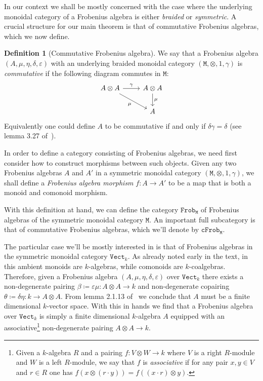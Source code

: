 \documentclass[11pt, reqno]{amsart}
\theoremstyle{definition}
\newtheorem{definition}[theorem]{Definition}
\newcommand{\cat}{\texttt}
\newcommand{\catfont}{\texttt}
\newcommand{\Vect}{{\catfont{Vect}}}        %
\newcommand{\Frob}{{\catfont{Frob}}} %
\newcommand{\cFrob}{{\catfont{cFrob}}} %
\begin{document}
In our context we shall be mostly concerned with the case where the underlying
monoidal category of a Frobenius algebra is either \emph{braided} or
\emph{symmetric}. A crucial structure for our main theorem is that of
commutative Frobenius algebras, which we now define.

\begin{definition}[Commutative Frobenius algebra]
\label{def:commutative-frobenius-algebra}
We say that a Frobenius algebra \((A, \mu, \eta, \delta, \varepsilon)\) with an
underlying braided monoidal category \((\cat M, \otimes, 1, \gamma)\) is
\emph{commutative} if the following diagram commutes in \(\cat M\):
\[
\begin{tikzcd}
A \otimes A \ar[r, "\gamma"] \ar[rd, "\mu"'] &A \otimes A \ar[d, "\mu"] \\
&A
\end{tikzcd}
\]
Equivalently one could define \(A\) to be commutative if and only if \(\delta
\gamma = \delta\) (see lemma 3.27 of~\cite{geiger}).
\end{definition}

In order to define a category consisting of Frobenius algebras, we need first
consider how to construct morphisms between such objects. Given any two
Frobenius algebras \(A\) and \(A'\) in a symmetric monoidal category
\((\cat M, \otimes, 1, \gamma)\), we shall define a \emph{Frobenius algebra
  morphism} \(f: A \to A'\) to be a map that is both a monoid and comonoid
morphism.

With this definition at hand, we can define the category \(\Frob_{\cat M}\) of
Frobenius algebras of the symmetric monoidal category \(\cat M\). An important
full subcategory is that of commutative Frobenius algebras, which we'll denote
by \(\cFrob_{\cat M}\).

The particular case we'll be mostly interested in is that of Frobenius algebras
in the symmetric monoidal category \(\Vect_k\). As already noted early in the
text, in this ambient monoids are \(k\)-algebras, while comonoids are
\(k\)-coalgebras. Therefore, given a Frobenius algebra
\((A, \mu, \eta, \delta, \varepsilon)\) over \(\Vect_k\) there exists a
non-degenerate pairing \(\beta \coloneq \varepsilon \mu: A \otimes A \to k\) and
non-degenerate copairing \(\theta \coloneq \delta \eta: k \to A \otimes
A\). From lemma 2.1.13 of~\cite{kock} we conclude that \(A\) must be a finite
dimensional \(k\)-vector space. With this in hands we find that a Frobenius
algebra over \(\Vect_k\) is simply a finite dimensional \(k\)-algebra \(A\)
equipped with an associative\footnote{Given a \(k\)-algebra \(R\) and a pairing
  \(f: V \otimes W \to k\) where \(V\) is a right \(R\)-module and \(W\) is a
  left \(R\)-module, we say that \(f\) is \emph{associative} if for any pair
  \(x, y \in V\) and \(r \in R\) one has
  \(f(x \otimes (r \cdot y)) = f((x \cdot r) \otimes y)\).  } non-degenerate
pairing \(A \otimes A \to k\).
\end{document}
